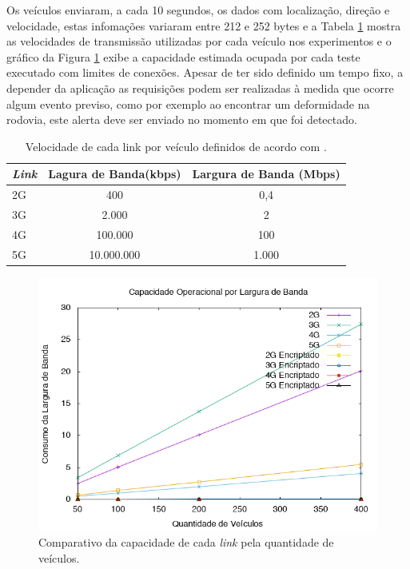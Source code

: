 \documentclass[
	12pt,				%
	oneside,			%
	a4paper,			%
	english,			%
	brazil				%
	]{abntex2ppgsi}
\begin{document}
Os veículos enviaram, a cada 10 segundos, os dados com localização, direção e velocidade, estas infomações variaram entre 212 e 252 bytes e a Tabela \ref{tbLink} mostra as velocidades de transmissão utilizadas por cada veículo nos experimentos e o gráfico da Figura \ref{fig:graficotaxatransferencia} exibe a capacidade estimada ocupada por cada teste executado com limites de conexões. Apesar de ter sido definido um tempo fixo, a depender da aplicação as requisições podem ser realizadas à medida que ocorre algum evento previso, como por exemplo ao encontrar um deformidade na rodovia, este alerta deve ser enviado no momento em que foi detectado.


\begin{table}[!h]
	\centering
	\caption{Velocidade de cada link por veículo definidos de acordo com .}
	\label{tbLink}
	\begin{tabular}{|l | c | c |}
		\hline
		\rowcolor[gray]{0.7}
		\textit{Link} & Lagura de Banda(kbps)   &    Largura de Banda  (Mbps)    \\ \hline
		\cellcolor[gray]{0.7}2G              & 400  & 0,4 \\ \hline
		\cellcolor[gray]{0.7}3G             & 2.000   & 2 \\ \hline
		\cellcolor[gray]{0.7}4G             & 100.000  & 100 \\ \hline
		\cellcolor[gray]{0.7}5G             & 10.000.000 &  1.000  \\ \hline
	\end{tabular}
\end{table}


\begin{figure}[h!]
	\centering
	\includegraphics[width=0.7\columnwidth]{images/capacidadeLink.png}
	\caption{Comparativo da capacidade de cada \textit{link} pela quantidade de veículos.}
	\label{fig:graficotaxatransferencia}
\end{figure}
\end{document}
